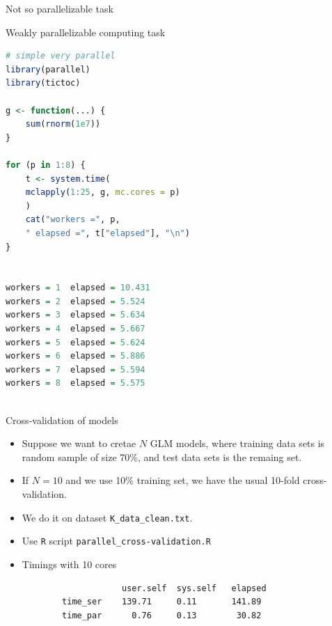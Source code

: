 \documentclass[compress,xcolor=table]{beamer}
\begin{document}
\begin{frame}[fragile]{Not so parallelizable task}
	\begin{block}{Weakly parallelizable computing task}\tiny
		\begin{lstlisting}[basicstyle=\color{blue}\tiny\ttfamily,language=R,escapeinside=`']
# simple very parallel
library(parallel)
library(tictoc)

g <- function(...) {
	sum(rnorm(1e7))
}

for (p in 1:8) {
	t <- system.time(
	mclapply(1:25, g, mc.cores = p)
	)	
	cat("workers =", p,
	" elapsed =", t["elapsed"], "\n")
}


workers = 1  elapsed = 10.431 
workers = 2  elapsed = 5.524 
workers = 3  elapsed = 5.634 
workers = 4  elapsed = 5.667 
workers = 5  elapsed = 5.624 
workers = 6  elapsed = 5.886 
workers = 7  elapsed = 5.594 
workers = 8  elapsed = 5.575 
			
		\end{lstlisting}
	\end{block}
\end{frame}


\begin{frame}[fragile]{Cross-validation of models}
\begin{itemize}
	\item 	Suppose we want to cretae $N$ GLM models, where training data sets is random sample of size 70\%, and test data sets is the remaing set. 
	\item If $N=10$ and we use 10\% training set, we have the usual 10-fold cross-validation.
	\item We do it on dataset {\tt K\_data\_clean.txt}.
	\item Use {\tt R} script {\tt parallel\_cross-validation.R}
	\item Timings with 10 cores
		\begin{verbatim}
		            user.self  sys.self   elapsed
        time_ser    139.71     0.11       141.89    
        time_par      0.76     0.13        30.82    
 \end{verbatim}
\end{itemize}
\end{frame}

%
\end{document}
